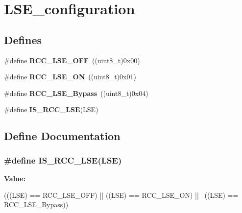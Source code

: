 \hypertarget{group__LSE__configuration}{
\section{LSE\_\-configuration}
\label{group__LSE__configuration}
}
\subsection*{Defines}
\begin{DoxyCompactItemize}
\item 
\hypertarget{group__LSE__configuration_ga6645c27708d0cad1a4ab61d2abb24c77}{
\#define {\bfseries RCC\_\-LSE\_\-OFF}~((uint8\_\-t)0x00)}
\label{group__LSE__configuration_ga6645c27708d0cad1a4ab61d2abb24c77}

\item 
\hypertarget{group__LSE__configuration_gac981ea636c2f215e4473901e0912f55a}{
\#define {\bfseries RCC\_\-LSE\_\-ON}~((uint8\_\-t)0x01)}
\label{group__LSE__configuration_gac981ea636c2f215e4473901e0912f55a}

\item 
\hypertarget{group__LSE__configuration_gac911af00bffa1bd1b1676f582a8a88e1}{
\#define {\bfseries RCC\_\-LSE\_\-Bypass}~((uint8\_\-t)0x04)}
\label{group__LSE__configuration_gac911af00bffa1bd1b1676f582a8a88e1}

\item 
\#define {\bfseries IS\_\-RCC\_\-LSE}(LSE)
\end{DoxyCompactItemize}


\subsection{Define Documentation}
\hypertarget{group__LSE__configuration_ga95d2678bf8f46e932e7cba75619a4d2c}{
\subsubsection[{IS\_\-RCC\_\-LSE}]{\setlength{\rightskip}{0pt plus 5cm}\#define IS\_\-RCC\_\-LSE(LSE)}}
\label{group__LSE__configuration_ga95d2678bf8f46e932e7cba75619a4d2c}
{\bfseries Value:}
\begin{DoxyCode}
(((LSE) == RCC_LSE_OFF) || ((LSE) == RCC_LSE_ON) || \
                         ((LSE) == RCC_LSE_Bypass))
\end{DoxyCode}
